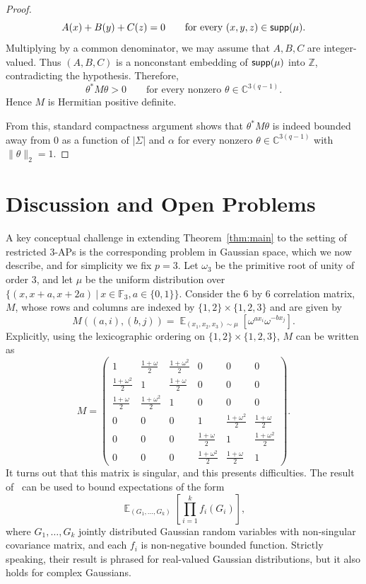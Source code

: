 \documentclass[10pt,a4paper]{amsart}
\newcommand\norm[1]{\| #1 \|}
\newcommand\Expect[2]{{\mathop{\mathbb{E}}_{#1}\left[ {#2} \right]}}
\begin{document}
\begin{proof}
\[ A(x)+B(y)+C(z)=0 \qquad \text{for every }(x,y,z)\in {\sf supp}(\mu). \]
Multiplying by a common denominator, we may assume that $A,B,C$ are integer-valued. Thus $(A, B, C)$ is a nonconstant embedding of ${\sf supp}(\mu)$ into $\mathbb{Z}$, contradicting the hypothesis. Therefore, \[ \theta^*M\theta>0 \qquad \text{for every nonzero } \theta\in\mathbb{C}^{3(q-1)}. \] Hence $M$ is Hermitian positive definite.

From this, standard compactness argument shows that $\theta^*M\theta$ is indeed bounded away from $0$ as a function of $|\Sigma|$ and $\alpha$ for every nonzero $\theta\in\mathbb{C}^{3(q-1)}$ with $\norm{\theta}_2 = 1$.
\end{proof}



\section{Discussion and Open Problems}\label{sec:discussion}
A key conceptual challenge in extending Theorem~\ref{thm:main} to the setting of restricted $3$-APs is the corresponding problem in Gaussian space, which we now describe, and for simplicity we fix $p=3$. 
Let $\omega_3$ be the primitive root of unity of order $3$, and let $\mu$ be the uniform distribution over $\{(x,x+a,x+2a)~|~x\in\mathbb{F}_3, a\in\{0,1\}\}$. Consider the $6$ by $6$ correlation matrix, $M$, whose rows and columns are indexed by $\{1,2\}\times\{1,2,3\}$ and are given by
\[
M((a,i),(b,j))
=\Expect{(x_1,x_2,x_3)\sim\mu}{\omega^{a x_i}\omega^{-b x_j}}.
\]
Explicitly, using the lexicographic ordering on $\{1,2\}\times\{1,2,3\}$, $M$ can be written as
\begin{equation}\label{matrix:M}
M = \begin{pmatrix}
1 & \frac{1+\omega}{2} & \frac{1+\omega^2}{2} & 0 & 0 & 0 \\
\frac{1+\omega^2}{2} & 1 & \frac{1+\omega}{2} & 0 & 0 & 0 \\
\frac{1+\omega}{2} & \frac{1+\omega^2}{2} & 1 & 0 & 0 & 0 \\
0 & 0 & 0 & 1 & \frac{1+\omega^2}{2} & \frac{1+\omega}{2} \\
0 & 0 & 0 & \frac{1+\omega}{2} & 1 & \frac{1+\omega^2}{2} \\
0 & 0 & 0 & \frac{1+\omega^2}{2} & \frac{1+\omega}{2} & 1
\end{pmatrix}.
\end{equation}
It turns out that this matrix is singular, and this presents difficulties. The result of~\cite{ChenDafnisPaouris2015HolderGaussian} can be used to bound expectations of the form
\[
\Expect{(G_1,\ldots,G_k)}{\prod\limits_{i=1}^{k}f_i(G_i)},
\]
where $G_1,\ldots,G_k$ jointly distributed Gaussian random variables with non-singular covariance matrix, and each $f_i$ is non-negative bounded function. Strictly speaking, their result is phrased for real-valued Gaussian distributions, but it also holds for complex Gaussians. 
\end{document}
